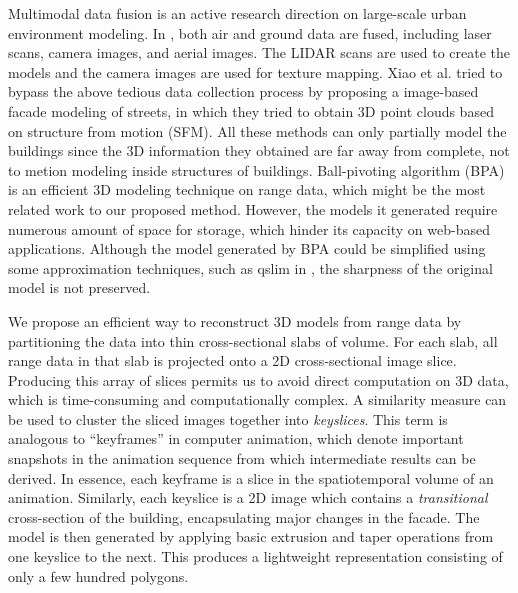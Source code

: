 \documentclass{acmsiggraph}                     %
\begin{document}
Multimodal data fusion is an active research direction on large-scale urban environment modeling.
In \cite{UM_Zakhor,UM_HYN}, both air and ground data are fused, including laser scans, camera images,
and aerial images. The LIDAR scans are used to create
the models and the camera images are used for texture mapping.
Xiao et al. \cite{UM_XFTQ} tried to bypass the above tedious data collection process by
proposing a image-based facade modeling of streets, in which they tried to obtain
3D point clouds based on structure from motion (SFM).
All these methods can only partially model the buildings since the 3D information they obtained are far away
from complete, not to metion modeling inside structures of buildings.
Ball-pivoting algorithm (BPA) \cite{BPA_BMRS} is an efficient 3D modeling technique on range data, which might be
the most related work to our proposed method. However, the models it generated require numerous amount
of space for storage, which hinder its capacity on web-based applications. Although the model
generated by BPA could be simplified using some approximation techniques, such as qslim in \cite{BPA_GH},
the sharpness of the original model is not preserved.

We propose an efficient way to reconstruct 3D models from range data by
partitioning the data into thin cross-sectional slabs of volume.
For each slab, all range data in that slab is projected onto a 2D
cross-sectional image slice.
Producing this array of slices permits us to avoid direct computation on
3D data, which is time-consuming and computationally complex.
A similarity measure \cite{IR_Brown} can be used to cluster the sliced images
together into {\it keyslices}.
This term is analogous to ``keyframes'' in computer animation, which denote
important snapshots in the animation sequence from which intermediate results
can be derived.
In essence, each keyframe is a slice in the spatiotemporal volume of
an animation.
Similarly, each keyslice is a 2D image which contains a {\it transitional}
cross-section of the building, encapsulating major changes in the facade.
The model is then generated by applying basic extrusion and taper
operations from one keyslice to the next.
This produces a lightweight representation consisting of only a few
hundred polygons.

\end{document}
